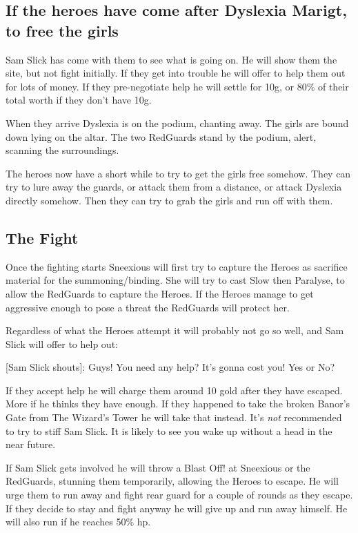 \subsection*{If the heroes have come after Dyslexia Marigt, to free the girls}
Sam Slick has come with them to see what is going on. He will show them the site, but not fight initially. If they get into trouble he will offer to help them out for lots of money. If they pre-negotiate help he will settle for 10g, or 80\% of their total worth if they don't have 10g.

When they arrive Dyslexia is on the podium, chanting away. The girls are bound down lying on the altar. The two RedGuards stand by the podium, alert, scanning the surroundings.

The heroes now have a short while to try to get the girls free somehow. They can try to lure away the guards, or attack them from a distance, or attack Dyslexia directly somehow. Then they can try to grab the girls and run off with them.


\subsection*{The Fight}
Once the fighting starts Sneexious will first try to capture the Heroes as sacrifice material for the summoning/binding. She will try to cast Slow then Paralyse, to allow the RedGuards to capture the Heroes. If the Heroes manage to get aggressive enough to pose a threat the RedGuards will protect her.

Regardless of what the Heroes attempt it will probably not go so well, and Sam Slick will offer to help out:
\begin{readoutloud}
\textnormal{[Sam Slick shouts]:} Guys! You need any help? It's gonna cost you! Yes or No?
\end{readoutloud}
If they accept help he will charge them around 10 gold after they have escaped. More if he thinks they have enough. If they happened to take the broken Banor's Gate from The Wizard's Tower he will take that instead. It's \emph{not} recommended to try to stiff Sam Slick. It is likely to see you wake up without a head in the near future.

If Sam Slick gets involved he will throw a Blast Off! at Sneexious or the RedGuards, stunning them temporarily, allowing the Heroes to escape. He will urge them to run away and fight rear guard for a couple of rounds as they escape. If they decide to stay and fight anyway he will give up and run away himself. He will also run if he reaches 50\% hp.

